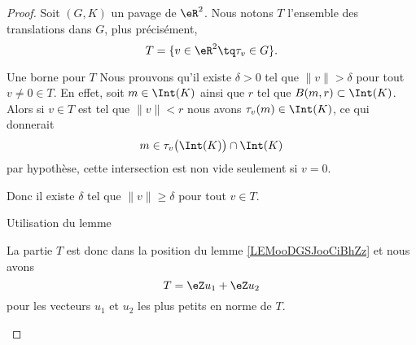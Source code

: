 \begin{proof}
    Soit \( (G,K)\) un pavage de \( \eR^2\).  Nous notons \( T\) l'ensemble des translations dans \( G\), plus précisément,
    \begin{equation}
        T=\{ v\in \eR^2\tq  \tau_v\in G\}.
    \end{equation}
    \begin{subproof}
        \item[Une borne pour \( T\)]
            Nous prouvons qu'il existe \( \delta>0\) tel que \( \| v \|>\delta\) pour tout \( v\neq 0\in T\). En effet, soit \( m\in \Int(K)\) ainsi que \( r\) tel que \( B(m,r)\subset \Int(K)\). Alors si \( v\in T\) est tel que \( \| v \|<r\) nous avons \( \tau_v(m)\in \Int(K)\), ce qui donnerait
            \begin{equation}
                m\in\tau_v\big( \Int(K) \big)\cap\Int(K)
            \end{equation}
            par hypothèse, cette intersection est non vide seulement si \( v=0\).

            Donc il existe \( \delta\) tel que \( \| v \|\geq \delta\) pour tout \( v\in T\).
        \item[Utilisation du lemme]

            La partie \( T\) est donc dans la position du lemme \ref{LEMooDGSJooCiBhZz} et nous avons
            \begin{equation}
                T=\eZ u_1+\eZ u_2
            \end{equation}
            pour les vecteurs \( u_1\) et \( u_2\) les plus petits en norme de \( T\).


\end{subproof}
\end{proof}
